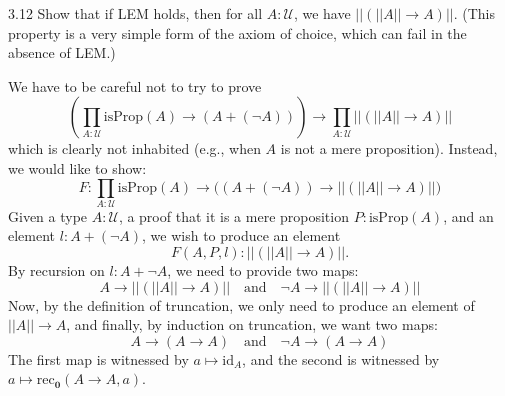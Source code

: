 \documentclass[14pt]{extarticle}
\newcommand{\0}{{\mathbf 0}}
\newcommand{\1}{{\mathbf 1}}
\newcommand{\2}{{\mathbf 2}}
\newcommand{\UU}{{\mathcal U}}
\newcommand{\mt}{\mapsto}
\newcommand{\rec}{\mathrm{rec}}
\newcommand{\id}{\mathrm{id}}
\newcommand{\isProp}{\mathrm{isProp}}
\begin{document}
\begin{prob}{3.12}{}
Show that if LEM holds, then for all $A : \UU$, we have $||(||A|| \to A)||$. (This property is a very simple form of the axiom of choice, which can fail in the absence of LEM.)
\end{prob}
We have to be careful not to try to prove
\[\left(\prod_{A:\UU}\isProp(A) \to (A + (\neg A)) \right) \to \prod_{A:\UU} ||(||A|| \to A)||\]
which is clearly not inhabited (e.g., when $A$ is not a mere proposition). Instead, we would like to show:
\[F : \prod_{A:\UU}\isProp(A) \to \Big((A + (\neg A)) \to ||(||A|| \to A)|| \Big)\]
Given a type $A:\UU$, a proof that it is a mere proposition $P : \isProp(A)$, and an element $l : A + (\neg A)$, we wish to produce an element \[F(A,P,l) : ||(||A|| \to A)||.\] By recursion on $l : A + \neg A$, we need to provide two maps:
\[A \to ||(||A|| \to A)|| \quad \text{and} \quad \neg A \to ||(||A|| \to A)||\]
Now, by the definition of truncation, we only need to produce an element of $||A|| \to A$, and finally, by induction on truncation, we want two maps:
\[A \to (A \to A) \quad \text{and} \quad \neg A \to (A \to A)\]
The first map is witnessed by $a \mt \id_{A}$, and the second is witnessed by $a \mt \rec_\0(A \to A,a)$.
\end{document}
